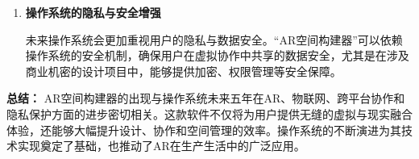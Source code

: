 \documentclass[UTF8]{homework}
\begin{document}
\begin{homeworkProblem}
\begin{enumerate}
	\item \textbf{操作系统的隐私与安全增强}  
	
	未来操作系统会更加重视用户的隐私与数据安全。“AR空间构建器”可以依赖操作系统的安全机制，确保用户在虚拟协作中共享的数据安全，尤其是在涉及商业机密的设计项目中，能够提供加密、权限管理等安全保障。
\end{enumerate}

\textbf{总结：}  
AR空间构建器的出现与操作系统未来五年在AR、物联网、跨平台协作和隐私保护方面的进步密切相关。这款软件不仅将为用户提供无缝的虚拟与现实融合体验，还能够大幅提升设计、协作和空间管理的效率。操作系统的不断演进为其技术实现奠定了基础，也推动了AR在生产生活中的广泛应用。

	
\end{homeworkProblem}



%
%
% 
% 
\end{document}
